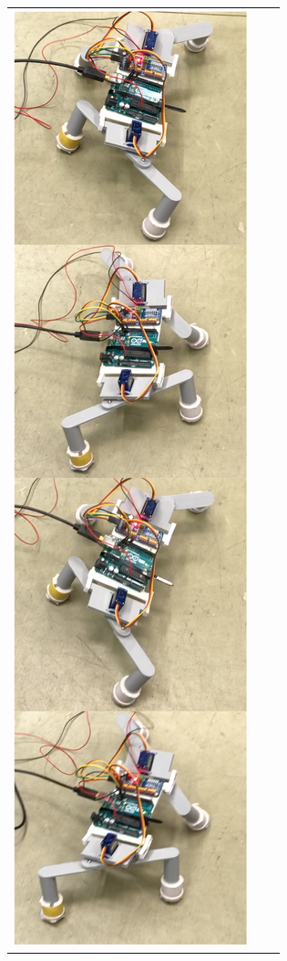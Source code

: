 \documentclass[uplatex,dvipdfmx]{jlreq}
\begin{document}
\begin{figure}[tb!]
    \begin{tabular}{ccc}
    \begin{minipage}{0.33\hsize}
      \centering 
      \includegraphics[width=\columnwidth]{./figure/pattern1_real.png}

\end{minipage}
\end{tabular}
\end{figure}
\end{document}
